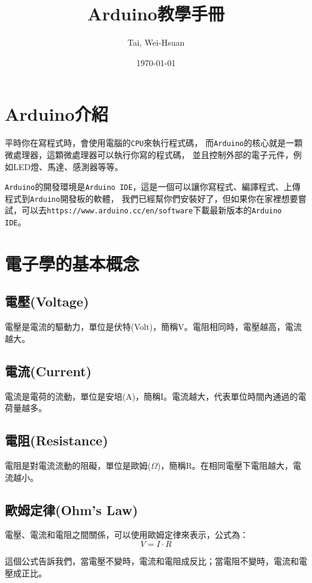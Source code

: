 \documentclass[12pt,a4paper]{article}
\title{Arduino教學手冊}
\author{Tai, Wei-Hsuan}
\date{\today}
\begin{document}
\maketitle

\newpage
\tableofcontents
\newpage

\newpage
\section{Arduino介紹}

平時你在寫程式時，會使用電腦的\texttt{CPU}來執行程式碼，
而\texttt{Arduino}的核心就是一顆微處理器，這顆微處理器可以執行你寫的程式碼，
並且控制外部的電子元件，例如LED燈、馬達、感測器等等。

\texttt{Arduino}的開發環境是\texttt{Arduino IDE}，這是一個可以讓你寫程式、編譯程式、上傳程式到\texttt{Arduino}開發板的軟體，
我們已經幫你們安裝好了，但如果你在家裡想要嘗試，可以去\texttt{https://www.arduino.cc/en/software}下載最新版本的\texttt{Arduino IDE}。

\section{電子學的基本概念}

\subsection{電壓(Voltage)}
電壓是電流的驅動力，單位是伏特(Volt)，簡稱V。電阻相同時，電壓越高，電流越大。

\subsection{電流(Current)}
電流是電荷的流動，單位是安培(A)，簡稱I。電流越大，代表單位時間內通過的電荷量越多。

\subsection{電阻(Resistance)}
電阻是對電流流動的阻礙，單位是歐姆($\Omega$)，簡稱R。在相同電壓下電阻越大，電流越小。

\subsection{歐姆定律(Ohm's Law)}
電壓、電流和電阻之間關係，可以使用歐姆定律來表示，公式為：
$$
V = I \cdot R
$$

這個公式告訴我們，當電壓不變時，電流和電阻成反比；當電阻不變時，電流和電壓成正比。
\end{document}
